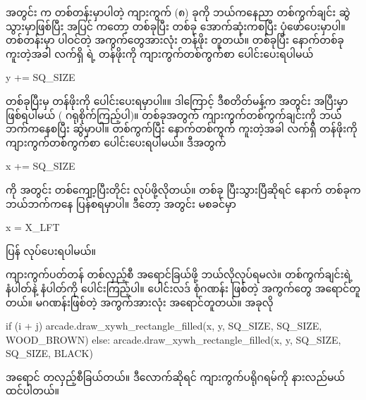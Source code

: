 အတွင်း   က တစ်တန်းမှာပါတဲ့ ကျားကွက် (၈) ခုကို   ဘယ်ကနေညာ တစ်ကွက်ချင်း  ဆွဲသွားမှာဖြစ်ပြီး အပြင်   ကတော့    တစ်ခုပြီး တစ်ခု အောက်ဆုံးကစပြီး ပုံဖော်ပေးမှာပါ။  တစ်တန်းမှာ ပါဝင်တဲ့ အကွက်တွေအားလုံး  တန်ဖိုး တူတယ်။  တစ်ခုပြီး နောက်တစ်ခု ကူးတဲ့အခါ လက်ရှိ  ရဲ့  တန်ဖိုးကို ကျားကွက်တစ်ကွက်စာ ပေါင်းပေးရပါမယ်
%
\begin{py}
y += SQ_SIZE
\end{py}
%
 တစ်ခုပြီးမှ  တန်ဖိုးကို ပေါင်းပေးရမှာပါ။။ ဒါကြောင့် ဒီစတိတ်မန့်က အတွင်း   အပြီးမှာ ဖြစ်ရပါမယ် ( ဂရုစိုက်ကြည့်ပါ)။  တစ်ခုအတွက် ကျားကွက်တစ်ကွက်ချင်းကို ဘယ်ဘက်ကနေစပြီး ဆွဲမှာပါ။ တစ်ကွက်ပြီး နောက်တစ်ကွက် ကူးတဲ့အခါ လက်ရှိ  တန်ဖိုးကို ကျားကွက်တစ်ကွက်စာ ပေါင်းပေးရပါမယ်။ ဒီအတွက်
%
\begin{py}
x += SQ_SIZE
\end{py}
%
ကို အတွင်း   တစ်ကျော့ပြီးတိုင်း လုပ်ဖို့လိုတယ်။  တစ်ခု ပြီးသွားပြီဆိုရင် နောက်  တစ်ခုက ဘယ်ဘက်ကနေ ပြန်စရမှာပါ။ ဒီတော့ အတွင်း   မစခင်မှာ
%
\begin{py}
x = X_LFT
\end{py}
%
ပြန် လုပ်ပေးရပါမယ်။

ကျားကွက်ပတ်တန် တစ်လှည့်စီ အရောင်ခြယ်ဖို့ ဘယ်လိုလုပ်ရမလဲ။ တစ်ကွက်ချင်းရဲ့  နံပါတ်နဲ့  နံပါတ်ကို ပေါင်းကြည့်ပါ။ ပေါင်းလဒ် စုံဂဏန်း ဖြစ်တဲ့ အကွက်တွေ အရောင်တူတယ်။ မဂဏန်းဖြစ်တဲ့ အကွက်အားလုံး အရောင်တူတယ်။ အခုလို 
%
\begin{py}
if (i + j) %
    arcade.draw_xywh_rectangle_filled(x, y, SQ_SIZE, SQ_SIZE, 
                                      WOOD_BROWN)
else:
    arcade.draw_xywh_rectangle_filled(x, y, SQ_SIZE, SQ_SIZE, 
                                      BLACK)
\end{py}
%
အရောင် တလှည့်စီခြယ်တယ်။ ဒီလောက်ဆိုရင် ကျားကွက်ပရိုဂရမ်ကို နားလည်မယ် ထင်ပါတယ်။

\begin{figure}[tb!]
\caption{}
\label{fig:ch07chkbrd}
\end{figure}

